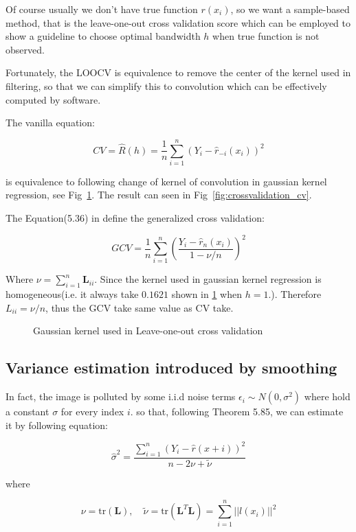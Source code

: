 \documentclass{article}
\begin{document}
Of course usually we don't have true function $r(x_i)$, so we want a sample-based method, 
that is the leave-one-out cross validation score which can be employed to show a guideline to choose optimal bandwidth $h$
when true function is not observed.

Fortunately, the LOOCV is equivalence to remove the center of the kernel used in filtering, so that we can simplify this to 
convolution which can be effectively computed by software.

The vanilla equation:

$$
CV = \hat{R}(h)=\frac{1}{n}\sum_{i=1}^n (Y_i-\hat{r}_{-i}(x_i))^2
$$

is equivalence to following change of kernel of convolution in gaussian kernel regression, see Fig~\ref{fig:gaussian_kernel}. 
The result can seen in Fig~\ref{fig:crossvalidation_cv}.

The Equation(5.36) in \cite{wasserman2006all} define the generalized cross validation:

$$
GCV = \frac{1}{n}\sum_{i=1}^n \left(\frac{Y_i-\hat{r}_n(x_i)}{1-\nu/n}\right)^2
$$

Where $\nu = \sum_{i=1}^n \mathbf{L}_{ii}$. Since the kernel used in gaussian kernel regression is homogeneous(i.e. it always take $0.1621$
shown in \ref{fig:gaussian_kernel} when $h=1$.). Therefore $L_{ii} = \nu/n$, thus the GCV take same value as CV take. 

\begin{figure}[htb]
  \centering
  
  \caption{Gaussian kernel used in Leave-one-out cross validation}
  \label{fig:gaussian_kernel}
\end{figure}


\subsection{Variance estimation introduced by smoothing}

In fact, the image is polluted by some i.i.d noise terms $\epsilon_i \sim N(0,\sigma^2)$ where hold a constant $\sigma$ for every index $i$.
so that, following \cite{wasserman2006all} Theorem 5.85, we can estimate it by following equation:

$$
\hat{\sigma}^2=\frac{\sum_{i=1}^n (Y_i-\hat{r}(x+i))^2}{n-2\nu+\tilde{\nu}}
$$

where

$$
\nu = \mathrm{tr}(\mathbf{L}), \quad 
\tilde{\nu}=\mathrm{tr}(\mathbf{L}^T\mathbf{L})=\sum_{i=1}^n||l(x_i)||^2
$$
\end{document}

